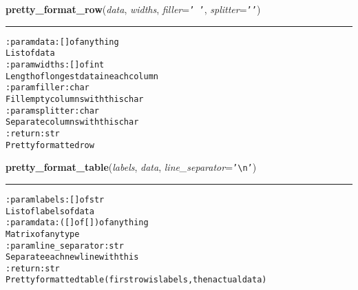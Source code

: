     \label{hal:streams:pretty_table:pretty_format_row}

    \vspace{0.5ex}

\hspace{.8\funcindent}\begin{boxedminipage}{\funcwidth}

    \raggedright \textbf{pretty\_format\_row}(\textit{data}, \textit{widths}, \textit{filler}={\tt \texttt{'}\texttt{ }\texttt{'}}, \textit{splitter}={\tt \texttt{'}\texttt{{\textbar}}\texttt{'}})

    \vspace{-1.5ex}

    \rule{\textwidth}{0.5\fboxrule}
\setlength{\parskip}{2ex}
\begin{alltt}

:param data: [] of anything
    List of data
:param widths: [] of int
    Length of longest data in each column
:param filler: char
    Fill empty columns with this char
:param splitter: char
    Separate columns with this char
:return: str
    Pretty formatted row
\end{alltt}

\setlength{\parskip}{1ex}
    \end{boxedminipage}

    \label{hal:streams:pretty_table:pretty_format_table}

    \vspace{0.5ex}

\hspace{.8\funcindent}\begin{boxedminipage}{\funcwidth}

    \raggedright \textbf{pretty\_format\_table}(\textit{labels}, \textit{data}, \textit{line\_separator}={\tt \texttt{'}\texttt{{\textbackslash}n}\texttt{'}})

    \vspace{-1.5ex}

    \rule{\textwidth}{0.5\fboxrule}
\setlength{\parskip}{2ex}
\begin{alltt}

:param labels: [] of str
    List of labels of data
:param data: ([] of []) of anything
    Matrix of any type
:param line\_separator: str
    Separate each new line with this
:return: str
    Pretty formatted table (first row is labels, then actual data)
\end{alltt}

\setlength{\parskip}{1ex}
    \end{boxedminipage}


